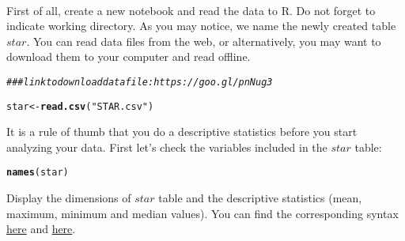 \documentclass{article}\usepackage[]{graphicx}\usepackage[]{color}
\makeatletter
\newcommand{\hlstr}[1]{\textcolor[rgb]{0.192,0.494,0.8}{#1}}%
\newcommand{\hlcom}[1]{\textcolor[rgb]{0.678,0.584,0.686}{\textit{#1}}}%
\newcommand{\hlstd}[1]{\textcolor[rgb]{0.345,0.345,0.345}{#1}}%
\newcommand{\hlkwb}[1]{\textcolor[rgb]{0.69,0.353,0.396}{#1}}%
\newcommand{\hlkwd}[1]{\textcolor[rgb]{0.737,0.353,0.396}{\textbf{#1}}}%
\newenvironment{kframe}{%
 \def\at@end@of@kframe{}%
 \ifinner\ifhmode%
  \def\at@end@of@kframe{\end{minipage}}%
  \begin{minipage}{\columnwidth}%
 \fi\fi%
 \def\FrameCommand##1{\hskip\@totalleftmargin \hskip-\fboxsep
 \colorbox{shadecolor}{##1}\hskip-\fboxsep
     \hskip-\linewidth \hskip-\@totalleftmargin \hskip\columnwidth}%
 \MakeFramed {\advance\hsize-\width
   \@totalleftmargin\z@ \linewidth\hsize
   \@setminipage}}%
 {\par\unskip\endMakeFramed%
 \at@end@of@kframe}
\newenvironment{knitrout}{}{} %
\makeatother
\begin{document}
\paragraph{}

First of all, create a new notebook and read the data to R. Do not forget to indicate working directory. As you may notice, we name the newly created table $star$. You can read data files from the web, or alternatively, you may want to download them to your computer and read offline.


\begin{knitrout}
\color{fgcolor}\begin{kframe}
\begin{alltt}
\hlcom{### link to download data file: https://goo.gl/pnNug3}

\hlstd{star} \hlkwb{<-} \hlkwd{read.csv}\hlstd{(}\hlstr{"STAR.csv"}\hlstd{)}
\end{alltt}


{\ttfamily\noindent{}}

{\ttfamily\noindent\bfseries{}}\end{kframe}
\end{knitrout}

It is a rule of thumb that you do a descriptive statistics before you start analyzing your data. First let's check the variables included in the $star$ table: 


\begin{knitrout}
\color{fgcolor}\begin{kframe}
\begin{alltt}
\hlkwd{names}\hlstd{(star)}
\end{alltt}


{\ttfamily\noindent\bfseries\color{errorcolor}{\#\# Error in eval(expr, envir, enclos): object 'star' not found}}\end{kframe}
\end{knitrout}

Display the dimensions of $star$ table and the descriptive statistics (mean, maximum, minimum and median values). You can find the corresponding syntax \href{https://davidsichinava.github.io/introstatsr/pages/m4/pres/meeting_4.html}{here} and \href{https://davidsichinava.github.io/introstatsr/pages/m5/pres/meeting_5.html}{here}.
\end{document}
